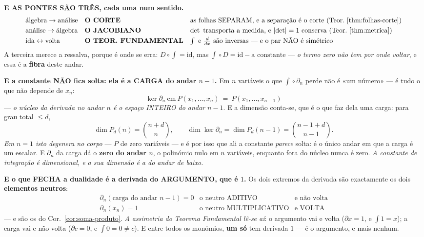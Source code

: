 \documentclass[11pt,a4paper]{article}
\newcommand{\abs}[1]{\lvert #1\rvert}
\begin{document}
\medskip
\noindent\textbf{E AS PONTES SÃO TRÊS, cada uma num sentido.}
\[
\begin{array}{lll}
\text{álgebra}\to\text{análise} & \textbf{O CORTE} &
\text{as folhas SEPARAM, e a separação é o corte (Teor.~\ref{thm:folhas-corte})}\\[3pt]
\text{análise}\to\text{álgebra} & \textbf{O JACOBIANO} &
\det\text{ transporta a medida, e }\abs{\det}=1\text{ conserva (Teor.~\ref{thm:metrica})}\\[3pt]
\text{ida}\leftrightarrow\text{volta} & \textbf{O TEOR. FUNDAMENTAL} &
\int\text{ e }\tfrac{d}{dx}\text{ são inversas --- e o par NÃO é simétrico}
\end{array}
\]
A terceira merece a ressalva, porque é onde se erra: $D\circ\!\int=\mathrm{id}$, mas
$\int\!\circ D=\mathrm{id}-\text{a constante}$ --- \emph{o termo zero não tem por onde
voltar}, e essa é a \textbf{fibra} deste andar.

\textbf{E a constante NÃO fica solta: ela é a CARGA do andar $n-1$.} Em $n$ variáveis o que
$\int\!\circ\partial_n$ perde não é «um número» --- é tudo o que não depende de $x_n$:
\[
\boxed{\;\ker\partial_n\ \text{em}\ P(x_1,\ldots,x_n)\ =\ P(x_1,\ldots,x_{n-1})\;}
\]
--- \emph{o núcleo da derivada no andar $n$ é o espaço INTEIRO do andar $n-1$}. E a
dimensão conta-se, que é o que faz dela uma carga: para grau total $\leq d$,
\[
\dim P_d(n)=\binom{n+d}{n},
\qquad
\dim\ker\partial_n=\dim P_d(n-1)=\binom{n-1+d}{n-1}.
\]
\emph{Em $n=1$ isto degenera no corpo} --- $P$ de zero variáveis --- e é por isso que ali a
constante \emph{parece} solta: é o único andar em que a carga é um escalar. E
$\partial_n$ da carga dá o \textbf{zero do andar $n$}, o polinómio nulo em $n$ variáveis,
enquanto fora do núcleo nunca é zero. \emph{A constante de integração é dimensional, e a
sua dimensão é a do andar de baixo.}

\textbf{E o que FECHA a dualidade é a derivada do ARGUMENTO, que é $1$.} Os dois extremos
da derivada são exactamente os dois \textbf{elementos neutros}:
\[
\boxed{
\begin{array}{lll}
\partial_n(\text{carga do andar }n{-}1) = 0 & \text{o neutro ADITIVO} & \text{e não volta}\\[2pt]
\partial_n(x_n) = 1 & \text{o neutro MULTIPLICATIVO} & \text{e VOLTA}
\end{array}}
\]
--- e são os do Cor.~\ref{cor:soma-produto}. \emph{A assimetria do Teorema Fundamental
lê-se aí}: o argumento vai e volta ($\partial x=1$, e $\int1=x$); a carga vai e não volta
($\partial c=0$, e $\int0=0\neq c$). E entre todos os monómios, \textbf{um só} tem derivada
$1$ --- é o argumento, e mais nenhum.
\end{document}
